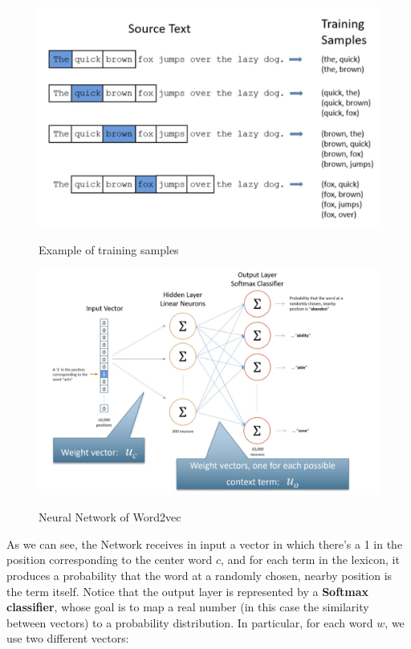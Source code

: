 \begin{figure}[h!]
		\centering
		\includegraphics[scale = 0.6]{img/word2vec2.jpg}
		\label{word2vec2}
        \caption{Example of training samples}
\end{figure}

\begin{figure}[h!]
		\centering
		\includegraphics[scale = 1.0]{img/word2vec3.jpg}
		\label{word2vec3}
        \caption{Neural Network of Word2vec}
\end{figure}

As we can see, the Network receives in input a vector in which there's a 1 in the position corresponding to the center word $c$, and for each term in the lexicon, it produces a probability that the word at a randomly chosen, nearby position is the term itself. Notice that the output layer is represented by a \textbf{Softmax classifier}, whose goal is to map a real number (in this case the similarity between vectors) to a probability distribution. In particular, for each word $w$, we use two different vectors:

